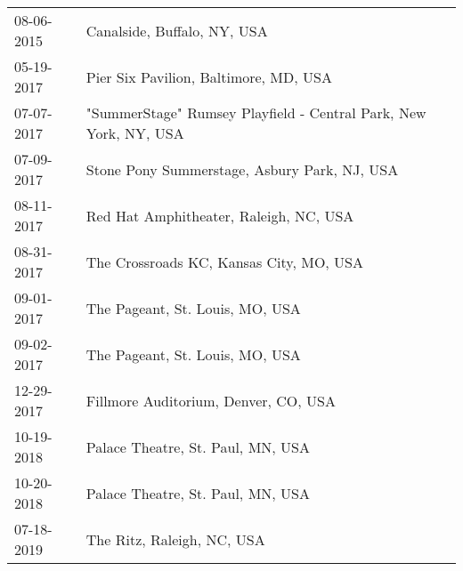 \begin{supertabular}{ll}
 08-06-2015 &                                       Canalside, Buffalo, NY, USA \\
 05-19-2017 &                             Pier Six Pavilion, Baltimore, MD, USA \\
 07-07-2017 &  "SummerStage" Rumsey Playfield - Central Park, New York, NY, USA \\
 07-09-2017 &                      Stone Pony Summerstage, Asbury Park, NJ, USA \\
 08-11-2017 &                            Red Hat Amphitheater, Raleigh, NC, USA \\
 08-31-2017 &                           The Crossroads KC, Kansas City, MO, USA \\
 09-01-2017 &                                   The Pageant, St. Louis, MO, USA \\
 09-02-2017 &                                   The Pageant, St. Louis, MO, USA \\
 12-29-2017 &                              Fillmore Auditorium, Denver, CO, USA \\
 10-19-2018 &                                 Palace Theatre, St. Paul, MN, USA \\
 10-20-2018 &                                 Palace Theatre, St. Paul, MN, USA \\
 07-18-2019 &                                        The Ritz, Raleigh, NC, USA \\
\end{supertabular}
